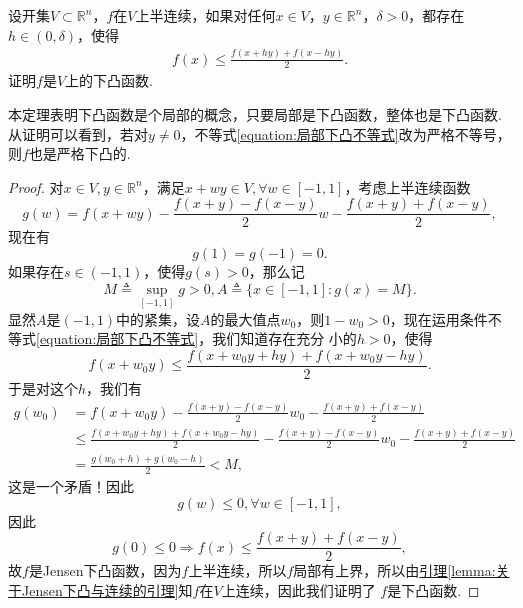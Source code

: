\documentclass[../../main.tex]{subfiles}%
\begin{document}
\begin{theorem}[下凸函数的局部定义]\label{theorem:下凸函数的局部定义}
设开集\(V\subset\mathbb{R}^n\)，\(f\)在\(V\)上半连续，如果对任何\(x\in V\)，\(y\in\mathbb{R}^n\)，\(\delta>0\)，都存在\(h\in(0,\delta)\)，使得
\begin{align}
f(x)\leqslant\frac{f(x + hy)+f(x - hy)}{2}.\label{equation:局部下凸不等式}
\end{align}
证明\(f\)是\(V\)上的下凸函数.
\end{theorem}
\begin{note}
本定理表明下凸函数是个局部的概念，只要局部是下凸函数，整体也是下凸函数. 从证明可以看到，若对\(y\neq0\)，不等式\eqref{equation:局部下凸不等式}改为严格不等号，则\(f\)也是严格下凸的.
\end{note}
\begin{proof}

对\(x\in V,y\in\mathbb{R}^n\)，满足\(x + wy\in V,\forall w\in[-1,1]\)，考虑上半连续函数
\[
g(w)=f(x + wy)-\frac{f(x + y)-f(x - y)}{2}w-\frac{f(x + y)+f(x - y)}{2},
\]
现在有
\[
g(1)=g(-1)=0.
\]
如果存在\(s\in(-1,1)\)，使得\(g(s)>0\)，那么记
\[
M\triangleq\sup_{[-1,1]}g>0,A\triangleq\{x\in[-1,1]:g(x)=M\}.
\]
显然\(A\)是\((-1,1)\)中的紧集，设\(A\)的最大值点\(w_0\)，则\(1 - w_0>0\)，现在运用条件不等式\eqref{equation:局部下凸不等式}，我们知道存在充分
小的\(h > 0\)，使得
\[
f(x + w_0y)\leqslant\frac{f(x + w_0y+hy)+f(x + w_0y - hy)}{2}.
\]
于是对这个\(h\)，我们有
\begin{align*}
g(w_0)&=f(x + w_0y)-\frac{f(x + y)-f(x - y)}{2}w_0-\frac{f(x + y)+f(x - y)}{2}\\
&\leqslant\frac{f(x + w_0y+hy)+f(x + w_0y - hy)}{2}-\frac{f(x + y)-f(x - y)}{2}w_0-\frac{f(x + y)+f(x - y)}{2}\\
&=\frac{g(w_0 + h)+g(w_0 - h)}{2}<M,
\end{align*}
这是一个矛盾！因此
\[
g(w)\leqslant0,\forall w\in[-1,1],
\]
因此
\[
g(0)\leqslant0\Rightarrow f(x)\leqslant\frac{f(x + y)+f(x - y)}{2},
\]
故\(f\)是Jensen下凸函数，因为\(f\)上半连续，所以\(f\)局部有上界，所以由\hyperref[lemma:关于Jensen下凸与连续的引理]{引理\ref{lemma:关于Jensen下凸与连续的引理}}知\(f\)在\(V\)上连续，因此我们证明了
\(f\)是下凸函数.

\end{proof}
\end{document}
